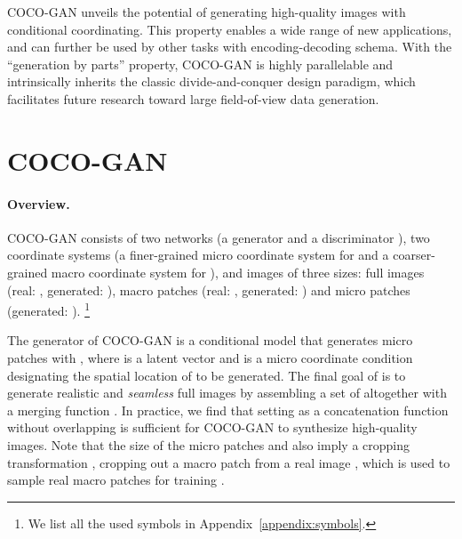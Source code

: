 \documentclass{article}
\newcommand{\modelName}{COCO-GAN }
\newcommand\blfootnote[1]{\begingroup
  \renewcommand\thefootnote{}\footnote{#1}\addtocounter{footnote}{-1}\endgroup
}
\begin{document}
    \modelName unveils the potential of generating high-quality images with conditional coordinating. This property enables a wide range of new applications, and can further be used by other tasks with encoding-decoding schema. With the ``generation by parts'' property, \modelName is highly parallelable and intrinsically inherits the classic divide-and-conquer design paradigm, which facilitates future research toward large field-of-view data generation.
    
    











































 





\section{\modelName}

    \paragraph{Overview.} \modelName consists of two networks (a generator  and a discriminator ), two coordinate systems (a finer-grained micro coordinate system for  and a coarser-grained macro coordinate system for ), and images of three sizes: full images (real: , generated: ), macro patches (real: , generated: ) and micro patches (generated: ). \blfootnote{We list all the used symbols in Appendix~\ref{appendix:symbols}.}
    
    The generator of \modelName is a conditional model that generates micro patches with , where  is a latent vector and  is a micro coordinate condition designating the spatial location of  to be generated. The final goal of  is to generate realistic and \textit{seamless} full images by assembling a set of  altogether with a merging function . In practice, we find that setting  as a concatenation function without overlapping is sufficient for \modelName to synthesize high-quality images. Note that the size of the micro patches and  also imply a cropping transformation , cropping out a macro patch  from a real image , which is used to sample real macro patches for training .
    
\end{document}
